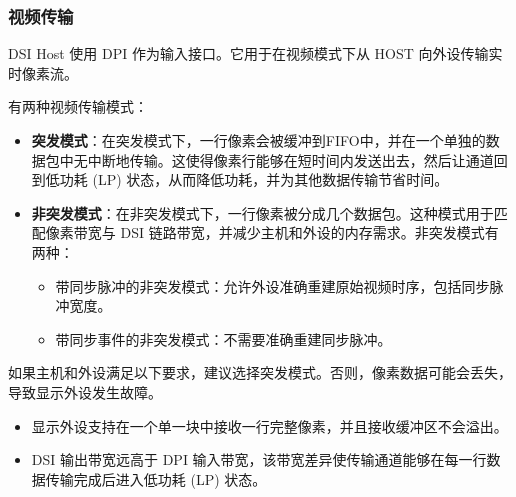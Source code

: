 \documentclass[main\_\_CN.tex]{subfiles}
\begin{document}
\subsubsection{视频传输}
DSI Host 使用 DPI 作为输入接口。它用于在视频模式下从 HOST 向外设传输实时像素流。

有两种视频传输模式：

\begin{itemize}
    \item \textbf{突发模式}：在突发模式下，一行像素会被缓冲到FIFO中，并在一个单独的数据包中无中断地传输。这使得像素行能够在短时间内发送出去，然后让通道回到低功耗 (LP) 状态，从而降低功耗，并为其他数据传输节省时间。
    \item \textbf{非突发模式}：在非突发模式下，一行像素被分成几个数据包。这种模式用于匹配像素带宽与 DSI 链路带宽，并减少主机和外设的内存需求。非突发模式有两种：
    \begin{itemize}
        \item 带同步脉冲的非突发模式：允许外设准确重建原始视频时序，包括同步脉冲宽度。
        \item 带同步事件的非突发模式：不需要准确重建同步脉冲。
    \end{itemize}
\end{itemize}

如果主机和外设满足以下要求，建议选择突发模式。否则，像素数据可能会丢失，导致显示外设发生故障。
\begin{itemize}
    \item 显示外设支持在一个单一块中接收一行完整像素，并且接收缓冲区不会溢出。
    \item DSI 输出带宽远高于 DPI 输入带宽，该带宽差异使传输通道能够在每一行数据传输完成后进入低功耗 (LP) 状态。
\end{itemize}
\end{document}
